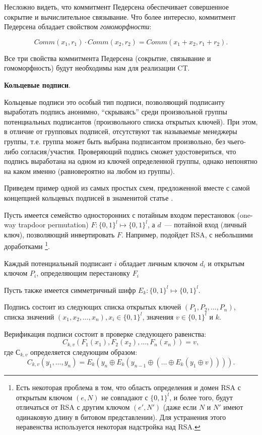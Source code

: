 \documentclass{article}
\begin{document}
 Несложно видеть, что коммитмент Педерсена обеспечивает совершенное сокрытие и вычислительное связывание.
 Что более интересно, коммитмент Педерсена обладает свойством \textit{гомоморфности}:

 $$
 Comm(x_1, r_1) \cdot Comm(x_2, r_2) = Comm(x_1 + x_2, r_1 + r_2).
 $$

Все три свойства коммитмента Педерсена (сокрытие, связывание и гомоморфность)
будут необходимы нам для реализации CT.

{\bf Кольцевые подписи}.

Кольцевые подписи это особый тип подписи,
позволяющий подписанту выработать подпись анонимно,
``скрываясь'' среди произвольной группы потенциальных подписантов (произвольного списка открытых ключей).
При этом, в отличие от групповых подписей,
отсутствуют так называемые менеджеры группы,
т.е. группа может быть выбрана подписантом произвольно,
без чьего-либо согласия/участия. Проверяющий подпись сможет удостовериться,
что подпись выработана на одном из ключей определенной группы,
однако непонятно на каком именно (равновероятно на любом из группы).

Приведем пример одной из самых простых схем,
предложенной вместе с самой концепцией кольцевых подписей в знаменитой статье \cite{ringSig}.

Пусть имеется семейство односторонних с потайным входом перестановок (one-way trapdoor permutation)
$F: \{0,1\}^l \mapsto \{0,1\}^l$, а $d$~--- потайной вход (личный ключ),
позволяющий инвертировать $F$.
Например, подойдет RSA, с небольшими доработками
\footnote{Есть некоторая проблема в том,
что область определения и домен RSA с открытым ключом $(e, N)$ не совпадают с $\{0,1\}^l$,
и более того, будут отличаться от RSA с другим ключом $(e', N')$
(даже если $N$ и $N'$ имеют одинаковую длину в битовом представлении).
Для устранения этого неравенства используется некоторая надстройка над RSA.}.

Каждый потенциальный подписант $i$ обладает личным ключом $d_i$ и открытым ключом $P_i$,
определяющим перестановку $F_i$

Пусть также имеется симметричный шифр $E_k: \{0,1\}^l \mapsto \{0,1\}^l$.

Подпись состоит из следующих списка открытых ключей $(P_1, P_2, \ldots, P_{n})$,
списка значений $(x_1, x_2, \ldots, x_{n}), x_i\in \{0,1\}^l$,
значения $v\in \{0,1\}^l$ и $k$.

Верификация подписи состоит в проверке следующего равенства:
$$
C_{k, v} (F_1(x_1), F_2(x_2), \ldots, F_n(x_n)) = v,
$$
где $С_{k, v}$ определяется следующим образом:
$$
C_{k,v}(y_1, \ldots, y_n) = E_k(y_n \oplus E_k(y_{n-1} \oplus (\ldots \oplus E_k(y_1 \oplus v)))).
$$
\end{document}

